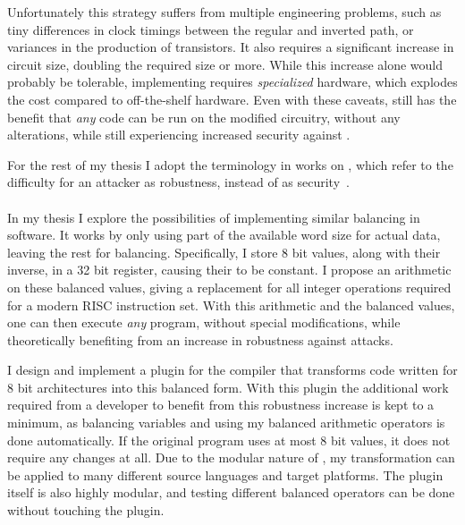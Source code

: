 Unfortunately this strategy suffers from multiple engineering problems, such as tiny differences in clock timings between the regular and inverted path\cite{baddam2008path}, or variances in the production of transistors\cite{razafindraibe2006formal}.
It also requires a significant increase in circuit size, doubling the required size or more\cite{baddam2008path}.
While this increase alone would probably be tolerable, implementing \dual{} requires \emph{specialized} hardware, which explodes the cost compared to off-the-shelf hardware.
Even with these caveats, \dual{} still has the benefit that \emph{any} code can be run on the modified circuitry, without any alterations, while still experiencing increased security against \poweranalysis{}.

For the rest of my thesis I adopt the terminology in works on \dual{}, which refer to the difficulty for an attacker as robustness, instead of as security~\cite{soares2008evaluating,razafindraibe2006formal}.
\\
\\
In my thesis I explore the possibilities of implementing similar balancing in software.
It works by only using part of the available word size for actual data, leaving the rest for balancing.
Specifically, I store 8 bit values, along with their inverse, in a 32 bit register, causing their \hammingw{} to be constant.
I propose an arithmetic on these balanced values, giving a replacement for all integer operations required for a modern RISC instruction set.
With this arithmetic and the balanced values, one can then execute \emph{any} program, without special modifications, while theoretically benefiting from an increase in robustness against \poweranalysis{} attacks.

I design and implement a plugin for the \llvm{} compiler that transforms code written for 8 bit architectures into this balanced form.
With this plugin the additional work required from a developer to benefit from this robustness increase is kept to a minimum, as balancing variables and using my balanced arithmetic operators is done automatically.
If the original program uses at most 8 bit values, it does not require any changes at all.
Due to the modular nature of \llvm{}, my transformation can be applied to many different source languages and target platforms.
The plugin itself is also highly modular, and testing different balanced operators can be done without touching the plugin.

